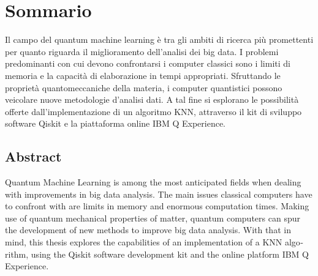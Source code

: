 \begingroup
\let\clearpage\relax
\let\cleardoublepage\relax
\let\cleardoublepage\relax

\chapter*{Sommario}
Il campo del quantum machine learning è tra gli ambiti di ricerca più 
promettenti per quanto riguarda il miglioramento dell'analisi dei big data. 
I problemi predominanti con cui devono confrontarsi i computer classici sono i 
limiti di memoria e la capacità di elaborazione in tempi appropriati.
Sfruttando le proprietà quantomeccaniche della materia, i computer quantistici 
possono veicolare nuove metodologie d'analisi dati. 
A tal fine si esplorano le possibilità offerte dall'implementazione di un algoritmo KNN, 
attraverso il kit di sviluppo software Qiskit e la piattaforma online IBM Q Experience. 



\vfill

\begin{otherlanguage}{english}
\chapter*{Abstract}
Quantum Machine Learning is among the most anticipated fields when dealing 
with improvements in big data analysis. 
The main issues classical computers have to confront with are limits in memory 
and enormous computation times. 
Making use of quantum mechanical properties of matter, quantum computers can
spur the development of new methods to improve big data analysis. 
With that in mind, this thesis explores the capabilities of an implementation of a KNN 
algorithm, using the Qiskit software development kit and the online platform IBM Q Experience. 
\end{otherlanguage}

\endgroup

\vfill
